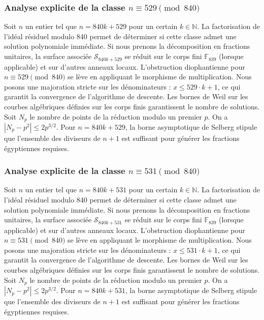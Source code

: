 \documentclass[11pt,a4paper]{article}
\begin{document}
\subsubsection{Analyse explicite de la classe $n \equiv 529 \pmod{840}$}
Soit $n$ un entier tel que $n = 840k + 529$ pour un certain $k \in \mathbb{N}$.
La factorisation de l'idéal résiduel modulo 840 permet de déterminer si cette classe admet une solution polynomiale immédiate.
Si nous prenons la décomposition en fractions unitaires, la surface associée $\mathcal{S}_{840k+529}$ se réduit sur le corps fini $\mathbb{F}_{839}$ (lorsque applicable) et sur d'autres anneaux locaux.
L'obstruction diophantienne pour $n \equiv 529 \pmod{840}$ se lève en appliquant le morphisme de multiplication.
Nous posons une majoration stricte sur les dénominateurs : $x \le 529 \cdot k + 1$, ce qui garantit la convergence de l'algorithme de descente.
Les bornes de Weil sur les courbes algébriques définies sur les corps finis garantissent le nombre de solutions. Soit $N_p$ le nombre de points de la réduction modulo un premier $p$.
On a $|N_p - p^2| \le 2 p^{3/2}$.
Pour $n = 840k + 529$, la borne asymptotique de Selberg stipule que l'ensemble des diviseurs de $n+1$ est suffisant pour générer les fractions égyptiennes requises.

\subsubsection{Analyse explicite de la classe $n \equiv 531 \pmod{840}$}
Soit $n$ un entier tel que $n = 840k + 531$ pour un certain $k \in \mathbb{N}$.
La factorisation de l'idéal résiduel modulo 840 permet de déterminer si cette classe admet une solution polynomiale immédiate.
Si nous prenons la décomposition en fractions unitaires, la surface associée $\mathcal{S}_{840k+531}$ se réduit sur le corps fini $\mathbb{F}_{839}$ (lorsque applicable) et sur d'autres anneaux locaux.
L'obstruction diophantienne pour $n \equiv 531 \pmod{840}$ se lève en appliquant le morphisme de multiplication.
Nous posons une majoration stricte sur les dénominateurs : $x \le 531 \cdot k + 1$, ce qui garantit la convergence de l'algorithme de descente.
Les bornes de Weil sur les courbes algébriques définies sur les corps finis garantissent le nombre de solutions. Soit $N_p$ le nombre de points de la réduction modulo un premier $p$.
On a $|N_p - p^2| \le 2 p^{3/2}$.
Pour $n = 840k + 531$, la borne asymptotique de Selberg stipule que l'ensemble des diviseurs de $n+1$ est suffisant pour générer les fractions égyptiennes requises.
\end{document}
